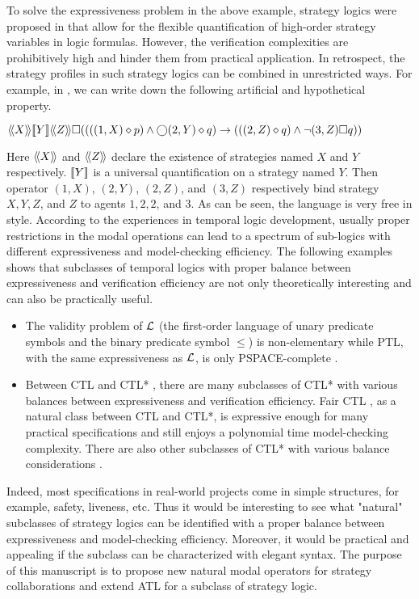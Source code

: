 To solve the expressiveness problem in the above example, strategy logics were proposed in \cite{CLM10,CHP10,MMV10} that allow for the flexible quantification of high-order strategy variables in logic formulas.  
However, the verification complexities are prohibitively high and hinder them from practical application.  
In retrospect, the strategy profiles in such strategy logics can be combined in unrestricted ways.  
For example, in \cite{MMV10}, we can write down the following artificial and hypothetical property.  
\begin{center} 
$\langle\!\langle X\rangle\!\rangle [\![ Y]\!]\langle\!\langle Z\rangle\!\rangle 
\square ((((1,X)\diamond p) \wedge \bigcirc (2,Y) \diamond q)\rightarrow
(((2,Z)\diamond q)\wedge\neg(3,Z)\square q))$
\end{center} 
Here $\langle\!\langle X\rangle\!\rangle$ and $\langle\!\langle Z\rangle\!\rangle$ declare the existence of strategies named $X$ and $Y$ respectively.  
$[\![ Y]\!]$ is a universal quantification on a strategy named $Y$.  
Then operator $(1,X)$, $(2,Y)$, $(2,Z)$, and $(3,Z)$ respectively bind strategy $X, Y, Z$, and $Z$ to agents $1, 2, 2$, and $3$.  
As can be seen, the language is very free in style.  
According to the experiences in temporal logic development, usually proper restrictions in the modal operations can lead to 
a spectrum of sub-logics with different expressiveness and model-checking efficiency.  
The following examples shows that subclasses of temporal logics with proper balance between expressiveness and verification efficiency are not only theoretically interesting and can also be practically useful.
\begin{itemize} 
\item The validity problem of $\cal L$ (the first-order language of 
  unary predicate symbols and the binary predicate symbol $\leq$) 
  is non-elementary \cite{Stockmeyer74} while 
  PTL, with the same expressiveness as $\cal L$, is only PSPACE-complete \cite{SC85}.  
\item Between CTL \cite{CES86} and CTL* \cite{EH85,EH86}, there are many subclasses of CTL* with various balances 
  between expressiveness and verification efficiency.  
  Fair CTL \cite{EL87}, as a natural class between CTL and CTL*, 
  is expressive enough for many practical specifications and 
  still enjoys a polynomial time model-checking complexity.  
  There are also other subclasses of CTL* with various balance considerations \cite{BPM83,EC80,EH86,Lamport80}.  
\end{itemize} 

Indeed, most specifications in real-world projects come in simple structures, for example, safety, liveness, etc. 
Thus it would be interesting to see what "natural" subclasses of strategy logics can be identified with a proper balance between expressiveness and model-checking efficiency.
Moreover, it would be practical and appealing if the subclass can be characterized with elegant syntax.  
The purpose of this manuscript is to propose new natural modal operators for strategy collaborations and extend ATL for a subclass of strategy logic.  

